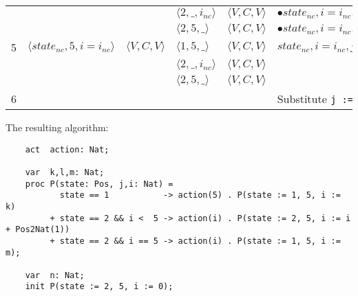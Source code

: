 \documentclass[a4paper,9pt]{article}
\begin{document}
\begin{tabular}{|l|l|l|l|l|l|}
	&					&				& $\langle 2, \_, i_{nc} \rangle$						& $\langle V,C,V\rangle$	& $\bullet state_{nc}, i=i_{nc}, j=5, k=\_, l=\_, m=\_, n=\_$ \\
	&					&				& $\langle 2, 5, \_ \rangle$							& $\langle V,C,V\rangle$	& $\bullet state_{nc}, i=i_{nc}, j=5, k=\_, l=\_, m=\_, n=\_$ \\
\hline
5	&$\langle state_{nc},5,i=i_{nc}\rangle$	& $\langle V,C,V\rangle$	& $\langle 1, 5, \_ \rangle$							& $\langle V,C,V\rangle$	& $state_{nc}, i=i_{nc}, j=5, k=\_, l=\_, m=\_, n=\_$ \\
	&					&				& $\langle 2, \_, i_{nc} \rangle$						& $\langle V,C,V\rangle$	& \\
	&					&				& $\langle 2, 5, \_ \rangle$							& $\langle V,C,V\rangle$	& \\
\hline
6	&					& 				& 										& 				& Substitute \verb"j := 5" \\

\hline	
\end{tabular}
The resulting algorithm:
\begin{verbatim}
    act  action: Nat;

    var  k,l,m: Nat;
    proc P(state: Pos, j,i: Nat) =
           state == 1           -> action(5) . P(state := 1, 5, i := k)
         + state == 2 && i <  5 -> action(i) . P(state := 2, 5, i := i + Pos2Nat(1))
         + state == 2 && i == 5 -> action(i) . P(state := 1, 5, i := m);

    var  n: Nat;
    init P(state := 2, 5, i := 0);
\end{verbatim}
\end{document}
